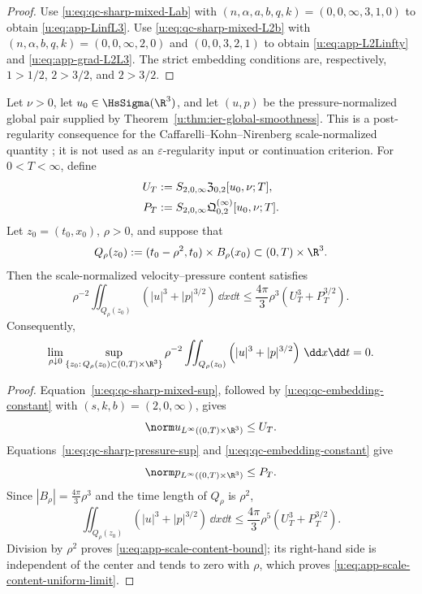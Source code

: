 \begin{proof}
Use \eqref{u:eq:qc-sharp-mixed-Lab} with
\((n,\alpha,a,b,q,k)=(0,0,\infty,3,1,0)\) to obtain
\eqref{u:eq:app-LinfL3}.  Use \eqref{u:eq:qc-sharp-mixed-L2b} with
\((n,\alpha,b,q,k)=(0,0,\infty,2,0)\) and
\((0,0,3,2,1)\) to obtain \eqref{u:eq:app-L2Linfty} and
\eqref{u:eq:app-grad-L2L3}.  The strict embedding conditions are,
respectively, \(1>1/2\), \(2>3/2\), and \(2>3/2\).
\end{proof}

\begin{corollary}
\label{u:thm:app-scale-content-extinction}
Let \(\nu>0\), let \(u_0\in\HsSigma(\R^3)\), and let \((u,p)\) be
the pressure-normalized global pair supplied by
Theorem~\ref{u:thm:ier-global-smoothness}.  This is a post-regularity
consequence for the Caffarelli--Kohn--Nirenberg scale-normalized quantity
\cite{CKN1982}; it is not used as an \(\varepsilon\)-regularity input or
continuation criterion.
For \(0<T<\infty\), define
\begin{align}
 U_T&:=S_{2,0,\infty}\mathfrak Z_{0,2}[u_0,\nu;T],\notag\\
 P_T&:=S_{2,0,\infty}
 \mathfrak Q^{(\infty)}_{0,2}[u_0,\nu;T].
 \label{u:eq:app-scale-content-majorants}
\end{align}
Let \(z_0=(t_0,x_0)\), \(\rho>0\), and suppose that
\[
 Q_\rho(z_0):=(t_0-\rho^2,t_0)\times B_\rho(x_0)
 \subset(0,T)\times\R^3.
\]
Then the scale-normalized velocity--pressure content satisfies
\begin{equation}
 \rho^{-2}\iint_{Q_\rho(z_0)}
 \left(|u|^3+|p|^{3/2}\right)\,\dd x\dd t
 \le\frac{4\pi}{3}\rho^3
 \left(U_T^3+P_T^{3/2}\right).
 \label{u:eq:app-scale-content-bound}
\end{equation}
Consequently,
\begin{equation}
 \lim_{\rho\downarrow0}
 \sup_{\{z_0:\,Q_\rho(z_0)\subset(0,T)\times\R^3\}}
 \rho^{-2}\iint_{Q_\rho(z_0)}
 \left(|u|^3+|p|^{3/2}\right)\,\dd x\dd t=0.
 \label{u:eq:app-scale-content-uniform-limit}
\end{equation}
\end{corollary}

\begin{proof}
Equation~\eqref{u:eq:qc-sharp-mixed-sup}, followed by
\eqref{u:eq:qc-embedding-constant} with \((s,k,b)=(2,0,\infty)\), gives
\[
 \norm u_{L^\infty((0,T)\times\R^3)}\le U_T.
\]
Equations~\eqref{u:eq:qc-sharp-pressure-sup} and
\eqref{u:eq:qc-embedding-constant} give
\[
 \norm p_{L^\infty((0,T)\times\R^3)}\le P_T.
\]
Since \(|B_\rho|=\frac{4\pi}{3}\rho^3\) and the time length of
\(Q_\rho\) is \(\rho^2\),
\[
 \iint_{Q_\rho(z_0)}\left(|u|^3+|p|^{3/2}\right)\,\dd x\dd t
 \le\frac{4\pi}{3}\rho^5
 \left(U_T^3+P_T^{3/2}\right).
\]
Division by \(\rho^2\) proves \eqref{u:eq:app-scale-content-bound}; its
right-hand side is independent of the center and tends to zero with
\(\rho\), which proves \eqref{u:eq:app-scale-content-uniform-limit}.
\end{proof}

